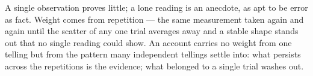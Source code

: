 %
%
%
%
%

\noindent A single observation proves little; a lone reading is an anecdote, as apt to be error as fact.
Weight comes from repetition --- the same measurement taken again and again until the scatter of any one trial
averages away and a stable shape stands out that no single reading could show. An account carries no weight from
one telling but from the pattern many independent tellings settle into: what persists across the repetitions is
the evidence; what belonged to a single trial washes out.

